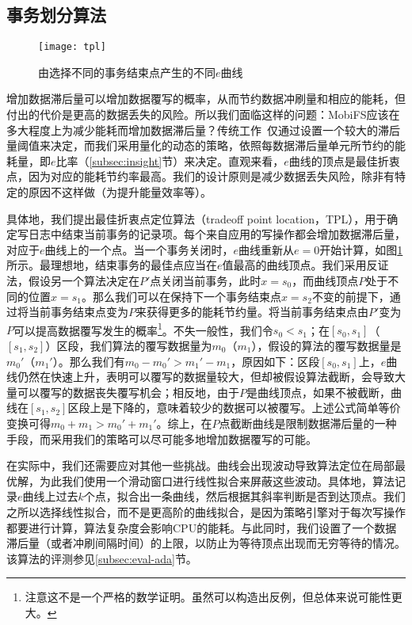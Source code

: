 \subsection{事务划分算法}
\label{subsec:point}

\begin{figure}
\centering
\texttt{[image: tpl]}
\caption{由选择不同的事务结束点产生的不同$e$曲线}
\label{fig:tpl}
\end{figure}

增加数据滞后量可以增加数据覆写的概率，从而节约数据冲刷量和相应的能耗，但付出的代价是更高的数据丢失的风险。所以我们面临这样的问题：MobiFS应该在多大程度上为减少能耗而增加数据滞后量？传统工作~\cite{Ma:2011:LPF:1989323.1989325, Mickens:2014:BFC:2616448.2616473, Ports:2010:TCA:1924943.1924963}仅通过设置一个较大的滞后量阈值来决定，而我们采用量化的动态的策略，依照每数据滞后量单元所节约的能耗量，即$e$比率（\ref{subsec:insight}节）来决定。直观来看，$e$曲线的顶点是最佳折衷点，因为对应的能耗节约率最高。我们的设计原则是减少数据丢失风险，除非有特定的原因不这样做（为提升能量效率等）。 

具体地，我们提出最佳折衷点定位算法（tradeoff point location，TPL），用于确定写日志中结束当前事务的记录项。每个来自应用的写操作都会增加数据滞后量，对应于$e$曲线上的一个点。当一个事务关闭时，$e$曲线重新从$e=0$开始计算，如图\ref{fig:tpl}所示。最理想地，结束事务的最佳点应当在$e$值最高的曲线顶点。我们采用反证法，假设另一个算法决定在$P'$点关闭当前事务，此时$x = s_0$，而曲线顶点$P$处于不同的位置$x = s_1$。那么我们可以在保持下一个事务结束点$x = s_2$不变的前提下，通过将当前事务结束点变为$P$来获得更多的能耗节约量。将当前事务结束点由$P'$变为$P$可以提高数据覆写发生的概率\footnote{注意这不是一个严格的数学证明。虽然可以构造出反例，但总体来说可能性更大。}。不失一般性，我们令$s_0 < s_1$；在$[s_0, s_1]$（$[s_1, s_2]$）区段，我们算法的覆写数据量为$m_0$（$m_1$），假设的算法的覆写数据量是$m_0'$（$m_1'$）。那么我们有$m_0 - m_0' > m_1' -
m_1$，原因如下：区段$[s_0, s_1]$上，$e$曲线仍然在快速上升，表明可以覆写的数据量较大，但却被假设算法截断，会导致大量可以覆写的数据丧失覆写机会；相反地，由于$P$是曲线顶点，如果不被截断，曲线在$[s_1, s_2]$区段上是下降的，意味着较少的数据可以被覆写。上述公式简单等价变换可得$m_0 + m_1 > m_0' + m_1'$。综上，在$P$点截断曲线是限制数据滞后量的一种手段，而采用我们的策略可以尽可能多地增加数据覆写的可能。
 
在实际中，我们还需要应对其他一些挑战。曲线会出现波动导致算法定位在局部最优解，为此我们使用一个滑动窗口进行线性拟合来屏蔽这些波动。具体地，算法记录$e$曲线上过去$k$个点，拟合出一条曲线，然后根据其斜率判断是否到达顶点。我们之所以选择线性拟合，而不是更高阶的曲线拟合，是因为策略引擎对于每次写操作都要进行计算，算法复杂度会影响CPU的能耗。与此同时，我们设置了一个数据滞后量（或者冲刷间隔时间）的上限，以防止为等待顶点出现而无穷等待的情况。该算法的评测参见\ref{subsec:eval-ada}节。

